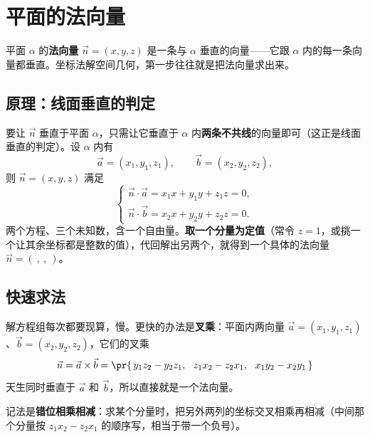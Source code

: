 \chapter{平面的法向量}

平面 $\alpha$ 的\textbf{法向量} $\vec n=(x,y,z)$ 是一条与 $\alpha$ 垂直的向量——它跟 $\alpha$ 内的每一条向量都垂直。坐标法解空间几何，第一步往往就是把法向量求出来。

\section{原理：线面垂直的判定}

要让 $\vec n$ 垂直于平面 $\alpha$，只需让它垂直于 $\alpha$ 内\textbf{两条不共线}的向量即可（这正是线面垂直的判定）。设 $\alpha$ 内有
\[
\vec a=(x_1,y_1,z_1),\qquad \vec b=(x_2,y_2,z_2),
\]
则 $\vec n=(x,y,z)$ 满足
\[
\begin{cases}
\vec n\cdot\vec a=x_1x+y_1y+z_1z=0,\\[2pt]
\vec n\cdot\vec b=x_2x+y_2y+z_2z=0.
\end{cases}
\]
两个方程、三个未知数，含一个自由量。\textbf{取一个分量为定值}（常令 $z=1$，或挑一个让其余坐标都是整数的值），代回解出另两个，就得到一个具体的法向量 $\vec n=(\ ,\ ,\ )$。

\section{快速求法}

解方程组每次都要现算，慢。更快的办法是\textbf{叉乘}：平面内两向量 $\vec a=(x_1,y_1,z_1)$、$\vec b=(x_2,y_2,z_2)$，它们的叉乘
\[
\vec n=\vec a\times\vec b=\pr{\,y_1z_2-y_2z_1,\ \ z_1x_2-z_2x_1,\ \ x_1y_2-x_2y_1\,}
\]
天生同时垂直于 $\vec a$ 和 $\vec b$，所以直接就是一个法向量。

记法是\textbf{错位相乘相减}：求某个分量时，把另外两列的坐标交叉相乘再相减（中间那个分量按 $z_1x_2-z_2x_1$ 的顺序写，相当于带一个负号）。


